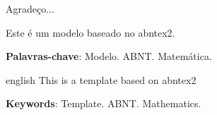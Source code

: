 \documentclass[grau=mestrado, openright]{ppgmat-ime-dissertacao}
\begin{document}
\frenchspacing %
\pretextual %

\imprimircapa
\imprimirfolhaderosto* %

% 

\begin{agradecimentos}
    Agradeço...
\end{agradecimentos}

\setlength{\absparsep}{18pt} %
\begin{resumo}
    Este é um modelo baseado no abntex2.

    \vspace{\onelineskip}
    \noindent
    \textbf{Palavras-chave}: Modelo. ABNT. Matemática.
\end{resumo}

\begin{resumo}[Abstract]
    \begin{otherlanguage*}{english}
        This is a template based on abntex2

    \vspace{\onelineskip}
    \noindent
    \textbf{Keywords}: Template. ABNT. Mathematics.

    \end{otherlanguage*}

\end{resumo}
\tableofcontents*
\cleardoublepage


\textual








\postextual
\printbibliography
\end{document}
